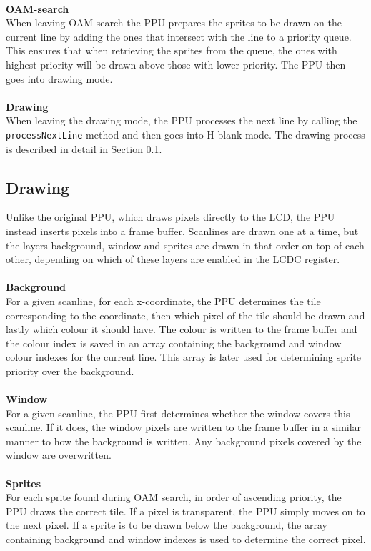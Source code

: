 \\
\textbf{OAM-search}\\
When leaving OAM-search the PPU prepares the sprites to be drawn on the current line by adding the ones that intersect with the line to a priority queue. This ensures that when retrieving the sprites from the queue, the ones with highest priority will be drawn above those with lower priority. The PPU then goes into drawing mode.\\
\\
\textbf{Drawing}\\
When leaving the drawing mode, the PPU processes the next line by calling the \texttt{processNextLine} method and then goes into H-blank mode. The drawing process is described in detail in Section \ref{sec:result-drawing}.

\subsection{Drawing}
\label{sec:result-drawing}
Unlike the original PPU, which draws pixels directly to the LCD, the PPU instead inserts pixels into a frame buffer. Scanlines are drawn one at a time, but the layers background, window and sprites are drawn in that order on top of each other, depending on which of these layers are enabled in the LCDC register.\\
\\
\textbf{Background}\\
For a given scanline, for each x-coordinate, the PPU determines the tile corresponding to the coordinate, then which pixel of the tile should be drawn and lastly which colour it should have. The colour is written to the frame buffer and the colour index is saved in an array containing the background and window colour indexes for the current line. This array is later used for determining sprite priority over the background.\\
\\
\textbf{Window}\\
For a given scanline, the PPU first determines whether the window covers this scanline. If it does, the window pixels are written to the frame buffer in a similar manner to how the background is written. Any background pixels covered by the window are overwritten.\\
\\
\newpage
\textbf{Sprites}\\
For each sprite found during OAM search, in order of ascending priority, the PPU draws the correct tile. If a pixel is transparent, the PPU simply moves on to the next pixel. If a sprite is to be drawn below the background, the array containing background and window indexes is used to determine the correct pixel.

